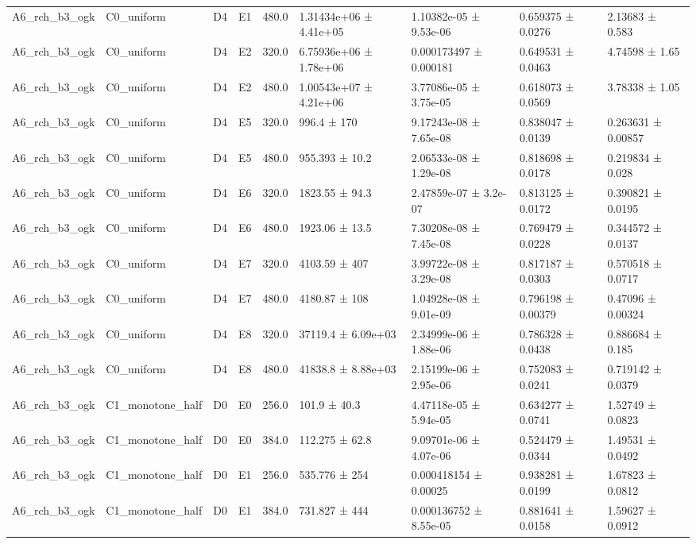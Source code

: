 \begin{table}
\begin{tabular}{lllllllll}
A6\_rch\_b3\_ogk & C0\_uniform & D4 & E1 & 480.0 & 1.31434e+06 ± 4.41e+05 & 1.10382e-05 ± 9.53e-06 & 0.659375 ± 0.0276 & 2.13683 ± 0.583 \\
A6\_rch\_b3\_ogk & C0\_uniform & D4 & E2 & 320.0 & 6.75936e+06 ± 1.78e+06 & 0.000173497 ± 0.000181 & 0.649531 ± 0.0463 & 4.74598 ± 1.65 \\
A6\_rch\_b3\_ogk & C0\_uniform & D4 & E2 & 480.0 & 1.00543e+07 ± 4.21e+06 & 3.77086e-05 ± 3.75e-05 & 0.618073 ± 0.0569 & 3.78338 ± 1.05 \\
A6\_rch\_b3\_ogk & C0\_uniform & D4 & E5 & 320.0 & 996.4 ± 170 & 9.17243e-08 ± 7.65e-08 & 0.838047 ± 0.0139 & 0.263631 ± 0.00857 \\
A6\_rch\_b3\_ogk & C0\_uniform & D4 & E5 & 480.0 & 955.393 ± 10.2 & 2.06533e-08 ± 1.29e-08 & 0.818698 ± 0.0178 & 0.219834 ± 0.028 \\
A6\_rch\_b3\_ogk & C0\_uniform & D4 & E6 & 320.0 & 1823.55 ± 94.3 & 2.47859e-07 ± 3.2e-07 & 0.813125 ± 0.0172 & 0.390821 ± 0.0195 \\
A6\_rch\_b3\_ogk & C0\_uniform & D4 & E6 & 480.0 & 1923.06 ± 13.5 & 7.30208e-08 ± 7.45e-08 & 0.769479 ± 0.0228 & 0.344572 ± 0.0137 \\
A6\_rch\_b3\_ogk & C0\_uniform & D4 & E7 & 320.0 & 4103.59 ± 407 & 3.99722e-08 ± 3.29e-08 & 0.817187 ± 0.0303 & 0.570518 ± 0.0717 \\
A6\_rch\_b3\_ogk & C0\_uniform & D4 & E7 & 480.0 & 4180.87 ± 108 & 1.04928e-08 ± 9.01e-09 & 0.796198 ± 0.00379 & 0.47096 ± 0.00324 \\
A6\_rch\_b3\_ogk & C0\_uniform & D4 & E8 & 320.0 & 37119.4 ± 6.09e+03 & 2.34999e-06 ± 1.88e-06 & 0.786328 ± 0.0438 & 0.886684 ± 0.185 \\
A6\_rch\_b3\_ogk & C0\_uniform & D4 & E8 & 480.0 & 41838.8 ± 8.88e+03 & 2.15199e-06 ± 2.95e-06 & 0.752083 ± 0.0241 & 0.719142 ± 0.0379 \\
A6\_rch\_b3\_ogk & C1\_monotone\_half & D0 & E0 & 256.0 & 101.9 ± 40.3 & 4.47118e-05 ± 5.94e-05 & 0.634277 ± 0.0741 & 1.52749 ± 0.0823 \\
A6\_rch\_b3\_ogk & C1\_monotone\_half & D0 & E0 & 384.0 & 112.275 ± 62.8 & 9.09701e-06 ± 4.07e-06 & 0.524479 ± 0.0344 & 1.49531 ± 0.0492 \\
A6\_rch\_b3\_ogk & C1\_monotone\_half & D0 & E1 & 256.0 & 535.776 ± 254 & 0.000418154 ± 0.00025 & 0.938281 ± 0.0199 & 1.67823 ± 0.0812 \\
A6\_rch\_b3\_ogk & C1\_monotone\_half & D0 & E1 & 384.0 & 731.827 ± 444 & 0.000136752 ± 8.55e-05 & 0.881641 ± 0.0158 & 1.59627 ± 0.0912 \\

\end{tabular}
\end{table}
